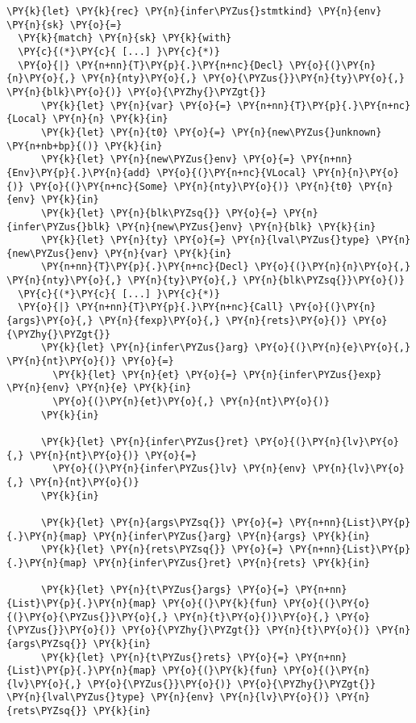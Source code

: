 \begin{Verbatim}[commandchars=\\\{\}]
\PY{k}{let} \PY{k}{rec} \PY{n}{infer\PYZus{}stmtkind} \PY{n}{env} \PY{n}{sk} \PY{o}{=}
  \PY{k}{match} \PY{n}{sk} \PY{k}{with}
  \PY{c}{(*}\PY{c}{ [...] }\PY{c}{*)}
  \PY{o}{|} \PY{n+nn}{T}\PY{p}{.}\PY{n+nc}{Decl} \PY{o}{(}\PY{n}{n}\PY{o}{,} \PY{n}{nty}\PY{o}{,} \PY{o}{\PYZus{}}\PY{n}{ty}\PY{o}{,} \PY{n}{blk}\PY{o}{)} \PY{o}{\PYZhy{}\PYZgt{}}
      \PY{k}{let} \PY{n}{var} \PY{o}{=} \PY{n+nn}{T}\PY{p}{.}\PY{n+nc}{Local} \PY{n}{n} \PY{k}{in}
      \PY{k}{let} \PY{n}{t0} \PY{o}{=} \PY{n}{new\PYZus{}unknown} \PY{n+nb+bp}{()} \PY{k}{in}
      \PY{k}{let} \PY{n}{new\PYZus{}env} \PY{o}{=} \PY{n+nn}{Env}\PY{p}{.}\PY{n}{add} \PY{o}{(}\PY{n+nc}{VLocal} \PY{n}{n}\PY{o}{)} \PY{o}{(}\PY{n+nc}{Some} \PY{n}{nty}\PY{o}{)} \PY{n}{t0} \PY{n}{env} \PY{k}{in}
      \PY{k}{let} \PY{n}{blk\PYZsq{}} \PY{o}{=} \PY{n}{infer\PYZus{}blk} \PY{n}{new\PYZus{}env} \PY{n}{blk} \PY{k}{in}
      \PY{k}{let} \PY{n}{ty} \PY{o}{=} \PY{n}{lval\PYZus{}type} \PY{n}{new\PYZus{}env} \PY{n}{var} \PY{k}{in}
      \PY{n+nn}{T}\PY{p}{.}\PY{n+nc}{Decl} \PY{o}{(}\PY{n}{n}\PY{o}{,} \PY{n}{nty}\PY{o}{,} \PY{n}{ty}\PY{o}{,} \PY{n}{blk\PYZsq{}}\PY{o}{)}
  \PY{c}{(*}\PY{c}{ [...] }\PY{c}{*)}
  \PY{o}{|} \PY{n+nn}{T}\PY{p}{.}\PY{n+nc}{Call} \PY{o}{(}\PY{n}{args}\PY{o}{,} \PY{n}{fexp}\PY{o}{,} \PY{n}{rets}\PY{o}{)} \PY{o}{\PYZhy{}\PYZgt{}}
      \PY{k}{let} \PY{n}{infer\PYZus{}arg} \PY{o}{(}\PY{n}{e}\PY{o}{,} \PY{n}{nt}\PY{o}{)} \PY{o}{=}
        \PY{k}{let} \PY{n}{et} \PY{o}{=} \PY{n}{infer\PYZus{}exp} \PY{n}{env} \PY{n}{e} \PY{k}{in}
        \PY{o}{(}\PY{n}{et}\PY{o}{,} \PY{n}{nt}\PY{o}{)}
      \PY{k}{in}

      \PY{k}{let} \PY{n}{infer\PYZus{}ret} \PY{o}{(}\PY{n}{lv}\PY{o}{,} \PY{n}{nt}\PY{o}{)} \PY{o}{=}
        \PY{o}{(}\PY{n}{infer\PYZus{}lv} \PY{n}{env} \PY{n}{lv}\PY{o}{,} \PY{n}{nt}\PY{o}{)}
      \PY{k}{in}

      \PY{k}{let} \PY{n}{args\PYZsq{}} \PY{o}{=} \PY{n+nn}{List}\PY{p}{.}\PY{n}{map} \PY{n}{infer\PYZus{}arg} \PY{n}{args} \PY{k}{in}
      \PY{k}{let} \PY{n}{rets\PYZsq{}} \PY{o}{=} \PY{n+nn}{List}\PY{p}{.}\PY{n}{map} \PY{n}{infer\PYZus{}ret} \PY{n}{rets} \PY{k}{in}

      \PY{k}{let} \PY{n}{t\PYZus{}args} \PY{o}{=} \PY{n+nn}{List}\PY{p}{.}\PY{n}{map} \PY{o}{(}\PY{k}{fun} \PY{o}{(}\PY{o}{(}\PY{o}{\PYZus{}}\PY{o}{,} \PY{n}{t}\PY{o}{)}\PY{o}{,} \PY{o}{\PYZus{}}\PY{o}{)} \PY{o}{\PYZhy{}\PYZgt{}} \PY{n}{t}\PY{o}{)} \PY{n}{args\PYZsq{}} \PY{k}{in}
      \PY{k}{let} \PY{n}{t\PYZus{}rets} \PY{o}{=} \PY{n+nn}{List}\PY{p}{.}\PY{n}{map} \PY{o}{(}\PY{k}{fun} \PY{o}{(}\PY{n}{lv}\PY{o}{,} \PY{o}{\PYZus{}}\PY{o}{)} \PY{o}{\PYZhy{}\PYZgt{}} \PY{n}{lval\PYZus{}type} \PY{n}{env} \PY{n}{lv}\PY{o}{)} \PY{n}{rets\PYZsq{}} \PY{k}{in}


\end{Verbatim}
